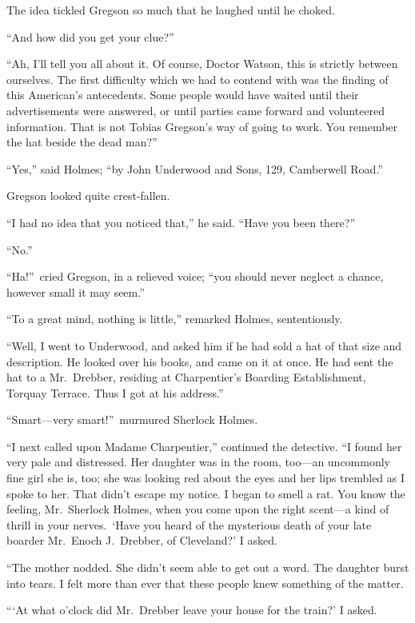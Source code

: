 \documentclass[12pt,english,oneside]{book}
\newcommand{\mdsh}[1]{\mbox{#1}\linebreak[1]}
\begin{document}
The idea tickled Gregson so much that he laughed until he choked.

{}``And how did you get your clue?''

{}``Ah, I'll tell you all about it. Of course, Doctor Watson, this
is strictly between ourselves. The first difficulty which we had to
contend with was the finding of this American's antecedents. Some
people would have waited until their advertisements were answered,
or until parties came forward and volunteered information. That is
not Tobias Gregson's way of going to work. You remember the hat beside
the dead man?''

{}``Yes,'' said Holmes; {}``by John Underwood and Sons, 129, Camberwell
Road.''

Gregson looked quite crest-fallen.

{}``I had no idea that you noticed that,'' he said. {}``Have you
been there?''

{}``No.''

{}``Ha!''\ cried Gregson, in a relieved voice; {}``you should
never neglect a chance, however small it may seem.''

{}``To a great mind, nothing is little,'' remarked Holmes, sententiously.

{}``Well, I went to Underwood, and asked him if he had sold a hat
of that size and description. He looked over his books, and came on
it at once. He had sent the hat to a Mr.\ Drebber, residing at Charpentier's
Boarding Establishment, Torquay Terrace. Thus I got at his address.''

{}``Smart\mdsh{---}very smart!''\ murmured Sherlock Holmes.

{}``I next called upon Madame Charpentier,'' continued the detective.
{}``I found her very pale and distressed. Her daughter was in the
room, too\mdsh{---}an uncommonly fine girl she is, too; she was looking
red about the eyes and her lips trembled as I spoke to her. That didn't
escape my notice. I began to smell a rat. You know the feeling, Mr.\ Sherlock
Holmes, when you come upon the right scent\mdsh{---}a kind of thrill
in your nerves.\  `Have you heard of the mysterious death of your
late boarder Mr.\ Enoch J.\ Drebber, of Cleveland?' I asked.

{}``The mother nodded. She didn't seem able to get out a word. The
daughter burst into tears. I felt more than ever that these people
knew something of the matter.

{}```At what o'clock did Mr.\ Drebber leave your house for the train?'
I asked.
\end{document}
